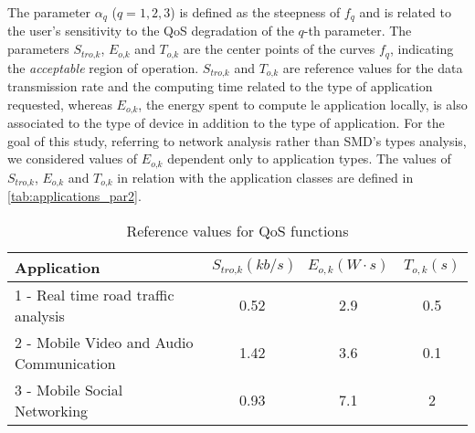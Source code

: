 \documentclass[twoside,openright]{report}
\begin{document}
The parameter $\alpha_q$ ($q = 1,2,3$) is defined as the steepness of $f_q$ and is related to the user's sensitivity to the \gls{QoS} degradation of the $q$-th parameter. The parameters $S_\textit{tro,k}$,  $E_\textit{o,k}$ and $T_\textit{o,k}$ are the center points of the curves $f_q$, indicating the \emph{acceptable} region of operation. $S_\textit{tro,k}$ and $T_\textit{o,k}$ are reference values for the data transmission rate and the computing time related to the type of application requested, whereas  $E_\textit{o,k}$, the energy spent to compute le application locally, is also associated to the type of device in addition to the type of application. For the goal of this study, referring to network analysis rather than \gls{SMD}'s types analysis, we considered values of $E_\textit{o,k}$ dependent only to application types. The values of $S_\textit{tro,k}$,  $E_\textit{o,k}$ and $T_\textit{o,k}$ in relation with the application classes are defined in \autoref{tab:applications_par2}. 

\begin{table}[tbp]
\begin{center}
\caption{Reference values for QoS functions}
\label{tab:applications_par2}
{
\renewcommand{\arraystretch}{2}
\begin{tabular}{p{8cm}|c|c|c}\hline\hline 
Application &  $S_\textit{tro,k} (\textit{kb/s})$  & $E_{o,k} (\textit{W}\cdot s)$ & $T_{o,k} (\textit{s})$\\  \hline
1 - Real time road traffic analysis  & 0.52   & 2.9  	 &	0.5  \\ 
2 - Mobile Video and Audio Communication & 1.42   & 3.6	 & 0.1 	\\ 
3 - Mobile Social Networking &0.93    & 7.1	 & 2 	\\   \hline
\end{tabular}
}
\end{center}
\end{table}
\end{document}
